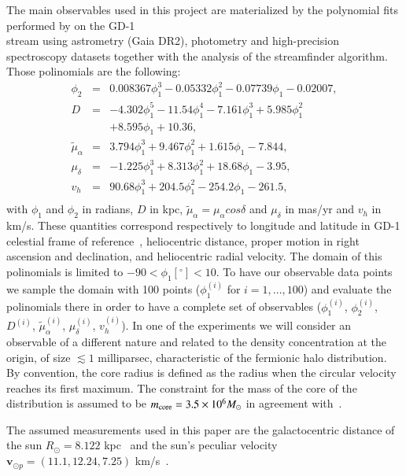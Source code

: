 \documentclass[twocolumn]{aa}
\begin{document}
The main observables used in this project are materialized by the polynomial fits performed by
\citet{Ibata_2020} on the GD-1\\ stream using astrometry (Gaia DR2), photometry and high-precision spectroscopy datasets together with the analysis of the {\sc streamfinder} algorithm.
Those polinomials are the following:
\begin{eqnarray}
   \label{Ibata_polyn}
   \phi_2  &=& 0.008367\phi_1^3-0.05332\phi_1^2-0.07739\phi_1-0.02007, \\
   D &=& -4.302\phi_1^5-11.54\phi_1^4-7.161\phi_1^3 +5.985\phi_1^2 \nonumber\\
      &&+ 8.595\phi_1+10.36,\\
   \tilde{\mu}_\alpha &=& 3.794\phi_1^3+9.467\phi_1^2+1.615\phi_1-7.844,\\
   \mu_\delta &=& -1.225\phi_1^3+8.313\phi_1^2+18.68\phi_1-3.95,\\
   v_h &=&  90.68\phi_1^3+204.5\phi_1^2-254.2\phi_1-261.5,\\
   \label{Ibata_polynb}
\end{eqnarray}
with $\phi_1$ and $\phi_2$ in radians, $D$ in kpc, $\tilde{\mu}_\alpha=\mu_\alpha cos \delta$ and $\mu_\delta$ in mas/yr and $v_h$ in km/s. These quantities correspond respectively to longitude and latitude in GD-1 celestial frame of reference~\citep{Koposov_2010}, heliocentric distance, proper motion in right ascension and declination, and heliocentric radial velocity.
The domain of this polinomials is limited to $-90<\phi_1[^\circ]<10$.
To have our observable data points we sample the domain with 100 points ($\phi_1^{(i)}$ for $i=1,...,100$)
and evaluate the polinomials there in order to have a complete set of observables ($\phi_1^{(i)}$, $\phi_2^{(i)}$, $D^{(i)}$, $\tilde{\mu}_\alpha^{(i)}$, $\mu_\delta^{(i)}$, $v_h^{(i)}$).
In one of the experiments we will consider an observable of a different nature
and related to the density concentration at the origin, of size $\lesssim 1$ milliparsec,
characteristic of the fermionic halo distribution. By convention, the core radius is defined
as the radius when the circular velocity reaches its first maximum.
The constraint for the mass of the core of the distribution is assumed to be $m_{\rm{core}}=3.5\times10^6 M_\odot$ in agreement with~\citet{2020A&A...641A..34B,2021MNRAS.505L..64B,2022MNRAS.511L..35A}.

The assumed measurements used in this paper are the
galactocentric distance of the sun $R_\odot=8.122$ kpc~\citep{2018A&A...615L..15G} and the sun's peculiar
velocity $\boldsymbol{v}_{\odot p} = (11.1, 12.24, 7.25)$ km/s~\citep{Shonrich}.
\end{document}
